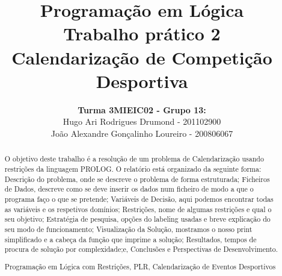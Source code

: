 \documentclass[runningheads,a4paper]{llncs}
\newcommand{\keywords}[1]{\par\addvspace\baselineskip
\noindent\keywordname\enspace\ignorespaces#1}
\begin{document}
\mainmatter

\title{Programação em Lógica\\Trabalho prático 2\\Calendarização de Competição Desportiva \linebreak}


\author{\textbf{Turma 3MIEIC02 - Grupo 13:}\\ Hugo Ari Rodrigues Drumond - 201102900 \\ João Alexandre Gonçalinho Loureiro - 200806067 \linebreak}



\maketitle

\begin{abstract}
O objetivo deste trabalho é a resolução de um problema de Calendarização usando restrições da linguagem PROLOG. O relatório está organizado da seguinte forma: Descrição do problema, onde se descreve o problema de forma estruturada; Ficheiros de Dados, descreve como se deve inserir os dados num ficheiro de modo a que o programa faço o que se pretende; Variáveis de Decisão, aqui podemos encontrar todas as variáveis e os respetivos domínios; Restrições, nome de algumas restrições e qual o seu objetivo; Estratégia de pesquisa, opções do labeling usadas e breve explicação do seu modo de funcionamento; Visualização da Solução, mostramos o nosso print simplificado e a cabeça da função que imprime a solução; Resultados, tempos de procura de solução por complexidade;e, Conclusões e Perspectivas de Desenvolvimento.
\keywords{Programação em Lógica com Restrições, PLR, Calendarização de Eventos Desportivos}
\end{abstract}
\newpage
\end{document}
